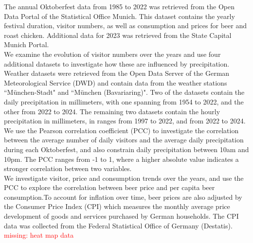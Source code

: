 \documentclass{article}
\theoremstyle{plain}
\theoremstyle{definition}
\theoremstyle{remark}
\begin{document}
The annual Oktoberfest data from 1985 to 2022 was retrieved from the Open Data Portal of the Statistical Office Munich. This dataset contains the yearly festival duration, visitor numbers, as well as consumption and prices for beer and roast chicken. Additional data for 2023 was retrieved from the State Capital Munich Portal. \\
We examine the evolution of visitor numbers over the years and use four additional datasets to investigate how these are influenced by precipitation. Weather datasets were retrieved from the Open Data Server of the German Meteorological Service (DWD) and contain data from the weather stations ``München-Stadt" and ``München (Bavariaring)". Two of the datasets contain the daily precipitation in millimeters, with one spanning from 1954 to 2022, and the other from 2022 to 2024. The remaining two datasets contain the hourly precipitation in millimeters, in ranges from 1997 to 2022, and from 2022 to 2024. We use the Pearson correlation coefficient (PCC) to investigate the correlation between the average number of daily visitors and the average daily precipitation during each Oktoberfest, and also constrain daily precipitation between 10am and 10pm. The PCC ranges from -1 to 1, where a higher absolute value indicates a stronger correlation between two variables.\\
We investigate visitor, price and consumption trends over the years, and use the PCC to explore the correlation between beer price and per capita beer consumption.To account for inflation over time, beer prices are also adjusted by the Consumer Price Index (CPI) which measures the monthly average price development of goods and services purchased by German households. The CPI data was collected from the Federal Statistical Office of Germany (Destatis).\\
\textcolor{red}{missing: heat map data}

% 
\end{document}
